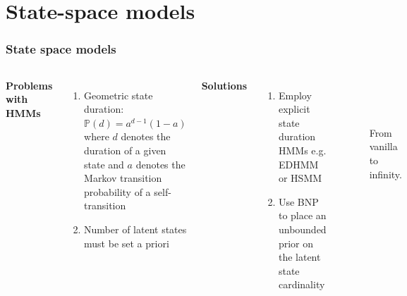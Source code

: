 \documentclass[aspectratio=169]{beamer}
\begin{document}
\section{State-space models}
\begin{frame}
    \frametitle{State space models}

    \begin{columns}
    {\bf Problems with HMMs}
    \begin{enumerate}
        \item Geometric state duration: $\mathbb{P}(d) = a^{d-1} (1-a)$ where $d$ denotes the duration of a given state and $a$ denotes the Markov transition probability of a self-transition
        \item Number of latent states must be set a priori
    \end{enumerate}
    {\bf Solutions}
    \begin{enumerate}
        \item Employ explicit state duration HMMs e.g. EDHMM or HSMM
        \item Use BNP to place an unbounded prior on the latent state cardinality
    \end{enumerate}
    \begin{figure}
        \\
        \\
    \caption{From vanilla to infinity.}
    \end{figure}
\end{columns}

\end{frame}
\end{document}
